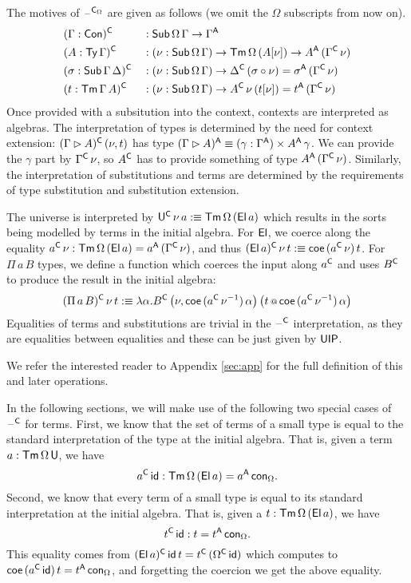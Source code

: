 \documentclass[acmsmall,review]{acmart}\settopmatter{printfolios=true,printccs=false,printacmref=false}
\begin{document}
The motives of $\mathord{\hspace{1pt}\text{--}\hspace{1pt}}^{\mathsf{C}_\Omega}$ are given as follows (we omit the
$\Omega$ subscripts from now on).
\begin{alignat*}{5}
  & (\Gamma:\mathsf{Con})^{\mathsf{C}} && : \mathsf{Sub}\,\Omega\,\Gamma\rightarrow\Gamma^{\mathsf{A}} \\
  & (A:\mathsf{Ty}\,\Gamma)^{\mathsf{C}} && : (\nu:\mathsf{Sub}\,\Omega\,\Gamma)\rightarrow\mathsf{Tm}\,\Omega\,(A[\nu])\rightarrow A^{\mathsf{A}}\,(\Gamma^{\mathsf{C}}\,\nu) \\
  & (\sigma:\mathsf{Sub}\,\Gamma\,\Delta)^{\mathsf{C}} && : (\nu:\mathsf{Sub}\,\Omega\,\Gamma)\rightarrow \Delta^{\mathsf{C}}\,(\sigma\circ\nu)=\sigma^{\mathsf{A}}\,(\Gamma^{\mathsf{C}}\,\nu) \\
  & (t:\mathsf{Tm}\,\Gamma\,A)^{\mathsf{C}} && : (\nu:\mathsf{Sub}\,\Omega\,\Gamma)\rightarrow A^{\mathsf{C}}\,\nu\,(t[\nu])=t^{\mathsf{A}}\,(\Gamma^{\mathsf{C}}\,\nu)
\end{alignat*}
Once provided with a subsitution into the context, contexts are
interpreted as algebras. The interpretation of types is determined by
the need for context extension: $(\Gamma\rhd A)^{\mathsf{C}}\,(\nu,t)$ has type
$(\Gamma\rhd A)^{\mathsf{A}}\equiv(\gamma:\Gamma^{\mathsf{A}})\times A^{\mathsf{A}}\,\gamma$. We can
provide the $\gamma$ part by $\Gamma^{\mathsf{C}}\,\nu$, so $A^{\mathsf{C}}$ has to
provide something of type $A^{\mathsf{A}}\,(\Gamma^{\mathsf{C}}\,\nu)$. Similarly, the
interpretation of substitutions and terms are determined by the
requirements of type substitution and substitution extension.

The universe is interpreted by $\mathsf{U}^{\mathsf{C}}\,\nu\,a :\equiv
\mathsf{Tm}\,\Omega\,(\mathsf{El}\,a)$ which results in the sorts being modelled by
terms in the initial algebra. For $\mathsf{El}$, we coerce along the equality
$a^{\mathsf{C}}\,\nu : \mathsf{Tm}\,\Omega\,(\mathsf{El}\,a) = a^{\mathsf{A}}\,(\Gamma^{\mathsf{C}}\,\nu)$, and thus
$(\mathsf{El}\,a)^{\mathsf{C}}\,\nu\,t :\equiv \mathsf{coe}\,(a^{\mathsf{C}}\,\nu)\,t$. For $\Pi\,a\,B$
types, we define a function which coerces the input along $a^{\mathsf{C}}$ and
uses $B^{\mathsf{C}}$ to produce the result in the initial algebra:
\[
(\Pi\,a\,B)^{\mathsf{C}}\,\nu\,t :\equiv \lambda\alpha.B^{\mathsf{C}}\,\big(\nu,\mathsf{coe}\,({a^{\mathsf{C}}\,\nu^{-1}})\,\alpha\big)\,\big(t\mathop{{\scriptstyle @}} \mathsf{coe}\,({a^{\mathsf{C}}\,\nu^{-1}})\,\alpha\big)
\]
Equalities of terms and substitutions are trivial in the $\mathord{\hspace{1pt}\text{--}\hspace{1pt}}^{\mathsf{C}}$
interpretation, as they are equalities between equalities and these
can be just given by $\mathsf{UIP}$.

We refer the interested reader to Appendix \ref{sec:app} for the full
definition of this and later operations.

In the following sections, we will make use of the following two
special cases of $\mathord{\hspace{1pt}\text{--}\hspace{1pt}}^{\mathsf{C}}$ for terms. First, we know that the set of
terms of a small type is equal to the standard interpretation of the
type at the initial algebra. That is, given a term
$a:\mathsf{Tm}\,\Omega\,\mathsf{U}$, we have
\[
a^{\mathsf{C}}\,\mathsf{id} : \mathsf{Tm}\,\Omega\,(\mathsf{El}\,a) = a^{\mathsf{A}}\,\mathsf{con}_\Omega.
\]
Second, we know that every term of a small type is equal to its
standard interpretation at the initial algebra. That is, given a
$t:\mathsf{Tm}\,\Omega\,(\mathsf{El}\,a)$, we have
\[
t^{\mathsf{C}}\,\mathsf{id} : t = t^{\mathsf{A}}\,\mathsf{con}_\Omega.
\]
This equality comes from $(\mathsf{El}\,a)^{\mathsf{C}}\,\mathsf{id}\,t =
t^{\mathsf{C}}\,(\Omega^{\mathsf{C}}\,\mathsf{id})$ which computes to $\mathsf{coe}\,(a^{\mathsf{C}}\,\mathsf{id})\,t =
t^{\mathsf{A}}\,\mathsf{con}_\Omega$, and forgetting the coercion we get the above
equality.
\end{document}
